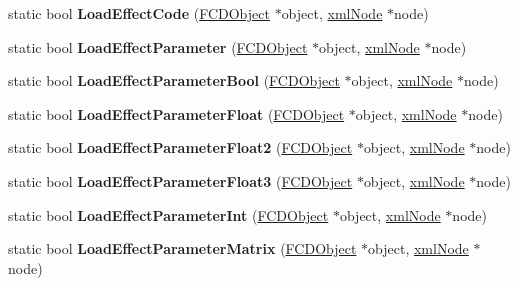 \begin{DoxyCompactItemize}
\item 
\hypertarget{classFArchiveXML_a24d260139664a8ebfd6c03867ac8fef1}{
static bool {\bfseries LoadEffectCode} (\hyperlink{classFCDObject}{FCDObject} $\ast$object, \hyperlink{struct__xmlNode}{xmlNode} $\ast$node)}
\label{classFArchiveXML_a24d260139664a8ebfd6c03867ac8fef1}

\item 
\hypertarget{classFArchiveXML_a6efa928ba5a0471fc33f9b7623ace940}{
static bool {\bfseries LoadEffectParameter} (\hyperlink{classFCDObject}{FCDObject} $\ast$object, \hyperlink{struct__xmlNode}{xmlNode} $\ast$node)}
\label{classFArchiveXML_a6efa928ba5a0471fc33f9b7623ace940}

\item 
\hypertarget{classFArchiveXML_a29c3f291898ca121df019ba96562c972}{
static bool {\bfseries LoadEffectParameterBool} (\hyperlink{classFCDObject}{FCDObject} $\ast$object, \hyperlink{struct__xmlNode}{xmlNode} $\ast$node)}
\label{classFArchiveXML_a29c3f291898ca121df019ba96562c972}

\item 
\hypertarget{classFArchiveXML_a96bc1c1dbd9288ab5d0ab53bf332744e}{
static bool {\bfseries LoadEffectParameterFloat} (\hyperlink{classFCDObject}{FCDObject} $\ast$object, \hyperlink{struct__xmlNode}{xmlNode} $\ast$node)}
\label{classFArchiveXML_a96bc1c1dbd9288ab5d0ab53bf332744e}

\item 
\hypertarget{classFArchiveXML_a2823a5559af325bd967dd88c6d1951d3}{
static bool {\bfseries LoadEffectParameterFloat2} (\hyperlink{classFCDObject}{FCDObject} $\ast$object, \hyperlink{struct__xmlNode}{xmlNode} $\ast$node)}
\label{classFArchiveXML_a2823a5559af325bd967dd88c6d1951d3}

\item 
\hypertarget{classFArchiveXML_a305287ced718d4dc17e5601ffbb1fcec}{
static bool {\bfseries LoadEffectParameterFloat3} (\hyperlink{classFCDObject}{FCDObject} $\ast$object, \hyperlink{struct__xmlNode}{xmlNode} $\ast$node)}
\label{classFArchiveXML_a305287ced718d4dc17e5601ffbb1fcec}

\item 
\hypertarget{classFArchiveXML_af963cd0c755b4111dfcbf7a04a592e6c}{
static bool {\bfseries LoadEffectParameterInt} (\hyperlink{classFCDObject}{FCDObject} $\ast$object, \hyperlink{struct__xmlNode}{xmlNode} $\ast$node)}
\label{classFArchiveXML_af963cd0c755b4111dfcbf7a04a592e6c}

\item 
\hypertarget{classFArchiveXML_a382fcc2676fa9c3d221fb360af796103}{
static bool {\bfseries LoadEffectParameterMatrix} (\hyperlink{classFCDObject}{FCDObject} $\ast$object, \hyperlink{struct__xmlNode}{xmlNode} $\ast$node)}
\label{classFArchiveXML_a382fcc2676fa9c3d221fb360af796103}


\end{DoxyCompactItemize}
